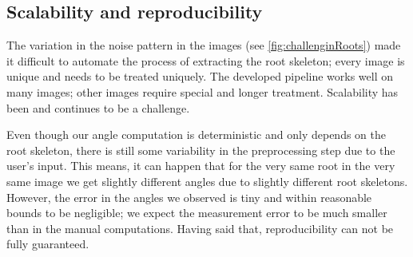 



\subsection{Scalability and reproducibility}

The variation in the noise pattern in the images (see \ref{fig:challenginRoots}) made it difficult to automate the process of extracting the root skeleton; every image is unique and needs to be treated uniquely. The developed pipeline works well on many images; other images require special and longer treatment. Scalability has been and continues to be a challenge.

Even though our angle computation is deterministic %
and only depends on the root skeleton, there is still some variability in the preprocessing step due to the user's input. This means, it can happen that for the very same root in the very same image we get slightly different angles due to slightly different root skeletons. %
However, the error in the angles we observed is tiny and within reasonable bounds to be negligible; we expect the measurement error to be much smaller than in the manual computations. Having said that, reproducibility can not be fully guaranteed. %



